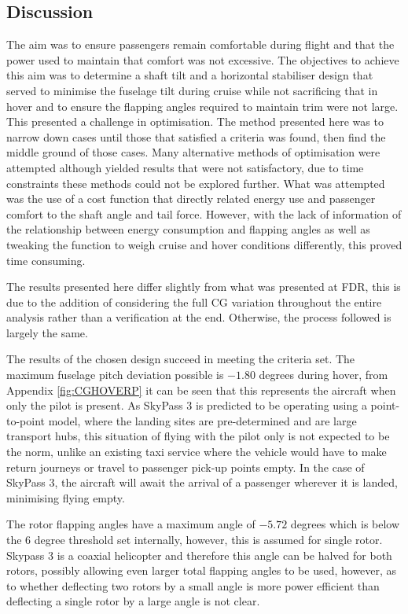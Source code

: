 \documentclass[11pt,a4paper]{article}
\begin{document}
\subsection{Discussion}
The aim was to ensure passengers remain comfortable during flight and that the power used to maintain that comfort was not excessive. 
The objectives to achieve this aim was to determine a shaft tilt and a horizontal stabiliser design that served to minimise the fuselage tilt during cruise while not sacrificing that in hover and to ensure the flapping angles required to maintain trim were not large. This presented a challenge in optimisation. The method presented here was to narrow down cases until those that satisfied a criteria was found, then find the middle ground of those cases. Many alternative methods of optimisation were attempted although yielded results that were not satisfactory, due to time constraints these methods could not be explored further. What was attempted was the use of a cost function that directly related energy use and passenger comfort to the shaft angle and tail force. However, with the lack of information of the relationship between energy consumption and flapping angles as well as tweaking the function to weigh cruise and hover conditions differently, this proved time consuming. 

The results presented here differ slightly from what was presented at FDR, this is due to the addition of considering the full CG variation throughout the entire analysis rather than a verification at the end. Otherwise, the process followed is largely the same. 

The results of the chosen design succeed in meeting the criteria set. The maximum fuselage pitch deviation possible is $-1.80$ degrees during hover, from Appendix \ref{fig:CGHOVERP} it can be seen that this represents the aircraft when only the pilot is present. As SkyPass 3 is predicted to be operating using a point-to-point model, where the landing sites are pre-determined and are large transport hubs, this situation of flying with the pilot only is not expected to be the norm, unlike an existing taxi service where the vehicle would have to make return journeys or travel to passenger pick-up points empty. In the case of SkyPass 3, the aircraft will await the arrival of a passenger wherever it is landed, minimising flying empty.

The rotor flapping angles have a maximum angle of $-5.72$ degrees which is below the $6$ degree threshold set internally, however, this is assumed for single rotor. Skypass 3 is a coaxial helicopter and therefore this angle can be halved for both rotors, possibly allowing even larger total flapping angles to be used, however, as to whether deflecting two rotors by a small angle is more power efficient than deflecting a single rotor by a large angle is not clear.
\end{document}
